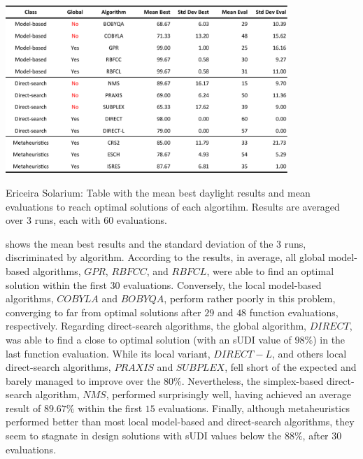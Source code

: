 \begin{table}[htbp]
	\centering
	\includegraphics[width=0.8\textwidth]{tables_and_code/Ericeira_phase1_stats_v1.pdf}
	\caption[Ericeira Solarium: Mean best results and evaluations discriminated per algorithm]{Ericeira Solarium: Table with the mean best daylight results and mean evaluations to reach optimal solutions of each algortihm. Results are averaged over $3$ runs, each with $60$ evaluations.}
	\label{table:phase1results}
\end{table}

 shows the mean best results and the standard deviation of the $3$ runs,  discriminated by algorithm. According to the results, in average, all global model-based algorithms, $GPR$, $RBFCC$, and $RBFCL$, were able to find an optimal solution within the first $30$ evaluations. Conversely, the local model-based algorithms, $COBYLA$ and $BOBYQA$, perform rather poorly in this problem, converging to far from optimal solutions after $29$ and $48$ function evaluations, respectively. Regarding direct-search algorithms, the global algorithm, $DIRECT$, was able to find a close to optimal solution (with an \ac{sUDI} value of $98\%$) in the last function evaluation. While its local variant, $DIRECT-L$, and others local direct-search algorithms, $PRAXIS$ and $SUBPLEX$, fell short of the expected and barely managed to improve over the $80\%$. Nevertheless, the simplex-based direct-search algorithm, $NMS$, performed surprisingly well, having achieved an average result of $89.67\%$ within the first $15$ evaluations. Finally, although metaheuristics performed better than most local model-based and direct-search algorithms, they seem to stagnate in design solutions with \ac{sUDI} values below the $88\%$, after $30$ evaluations.

